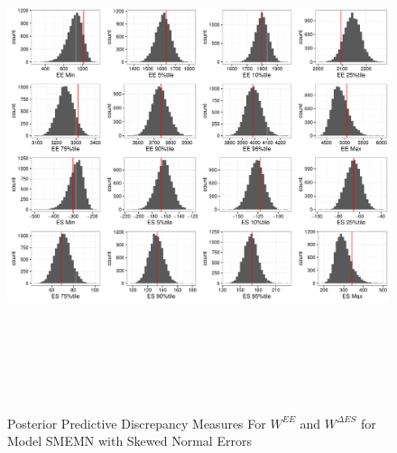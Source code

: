 \documentclass[11pt]{article}\usepackage[]{graphicx}\usepackage[]{color}
\begin{document}
  \begin{figure}
  \centering
  \includegraphics[width=17cm,height=15cm]{manual_figure/wpwdiagbvn.pdf}
  \caption{Posterior Predictive Discrepancy Measures For $W^{EE}$ and $W^{\Delta ES}$ for Model SMEMN with Skewed Normal Errors}
  \label{wpwdiagSMEMN}
  \end{figure}
\end{document}
